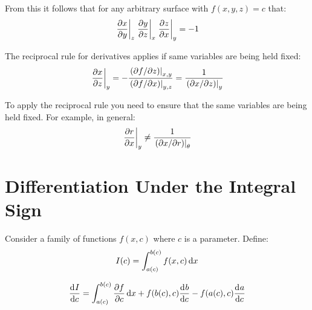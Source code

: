 \documentclass[../main.tex]{subfiles}
\begin{document}
From this it follows that for any arbitrary surface with $f(x, y, z) = c$ that:
\[
  \at{\pderiv{x}{y}}{z} \at{\pderiv{y}{z}}{x} \at{\pderiv{z}{x}}{y} = -1
\]
\begin{proposition}
The reciprocal rule for derivatives applies if same variables are being held fixed:
\[
  \at{\pderiv{x}{z}}{y} = -\frac{\at{(\partial f/\partial z)}{x, y}}{\at{(\partial f/\partial x)}{y, z}} = \frac{1}{\at{(\partial x/\partial z)}{y}}
\]
\end{proposition}
\begin{remark}[Warning]
  To apply the reciprocal rule you need to ensure that the same variables are being held fixed.
  For example, in general:
  \[
    \at{\pderiv{r}{x}}{y} \neq \frac{1}{\at{(\partial x/\partial r)}{\theta}}
  \]
\end{remark}
\section{Differentiation Under the Integral Sign}
Consider a family of functions $f(x, c)$ where $c$ is a parameter.
Define:
\[
  I(c) = \int_{a(c)}^{b(c)} f(x, c) \,\mathrm{d} x
\]
\begin{theorem}
  \[
    \deriv{I}{c} = \int_{a(c)}^{b(c)} \pderiv{f}{c} \d{x} + f(b(c), c) \deriv{b}{c} - f(a(c), c) \deriv{a}{c}
    \label{dutis}
  \]
\end{theorem}
\end{document}
